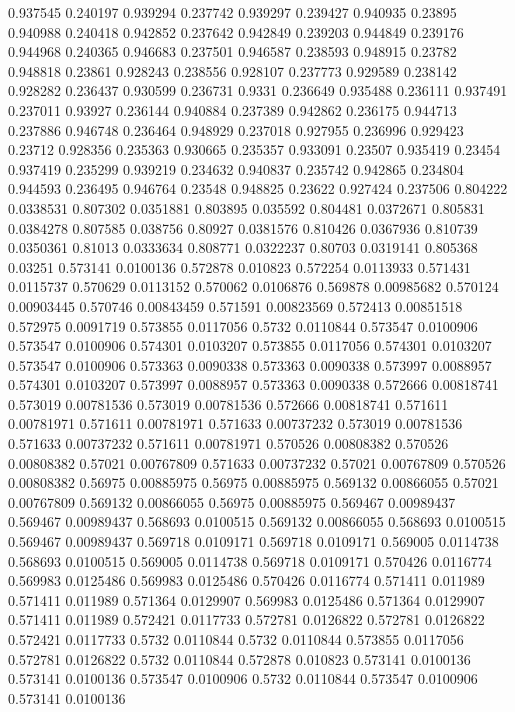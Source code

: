 0.937545 0.240197
0.939294 0.237742
0.939297 0.239427
0.940935 0.23895
0.940988 0.240418
0.942852 0.237642
0.942849 0.239203
0.944849 0.239176
0.944968 0.240365
0.946683 0.237501
0.946587 0.238593
0.948915 0.23782
0.948818 0.23861
0.928243 0.238556
0.928107 0.237773
0.929589 0.238142
0.928282 0.236437
0.930599 0.236731
0.9331 0.236649
0.935488 0.236111
0.937491 0.237011
0.93927 0.236144
0.940884 0.237389
0.942862 0.236175
0.944713 0.237886
0.946748 0.236464
0.948929 0.237018
0.927955 0.236996
0.929423 0.23712
0.928356 0.235363
0.930665 0.235357
0.933091 0.23507
0.935419 0.23454
0.937419 0.235299
0.939219 0.234632
0.940837 0.235742
0.942865 0.234804
0.944593 0.236495
0.946764 0.23548
0.948825 0.23622
0.927424 0.237506
0.804222 0.0338531
0.807302 0.0351881
0.803895 0.035592
0.804481 0.0372671
0.805831 0.0384278
0.807585 0.038756
0.80927 0.0381576
0.810426 0.0367936
0.810739 0.0350361
0.81013 0.0333634
0.808771 0.0322237
0.80703 0.0319141
0.805368 0.03251
0.573141 0.0100136
0.572878 0.010823
0.572254 0.0113933
0.571431 0.0115737
0.570629 0.0113152
0.570062 0.0106876
0.569878 0.00985682
0.570124 0.00903445
0.570746 0.00843459
0.571591 0.00823569
0.572413 0.00851518
0.572975 0.0091719
0.573855 0.0117056
0.5732 0.0110844
0.573547 0.0100906
0.573547 0.0100906
0.574301 0.0103207
0.573855 0.0117056
0.574301 0.0103207
0.573547 0.0100906
0.573363 0.0090338
0.573363 0.0090338
0.573997 0.0088957
0.574301 0.0103207
0.573997 0.0088957
0.573363 0.0090338
0.572666 0.00818741
0.573019 0.00781536
0.573019 0.00781536
0.572666 0.00818741
0.571611 0.00781971
0.571611 0.00781971
0.571633 0.00737232
0.573019 0.00781536
0.571633 0.00737232
0.571611 0.00781971
0.570526 0.00808382
0.570526 0.00808382
0.57021 0.00767809
0.571633 0.00737232
0.57021 0.00767809
0.570526 0.00808382
0.56975 0.00885975
0.56975 0.00885975
0.569132 0.00866055
0.57021 0.00767809
0.569132 0.00866055
0.56975 0.00885975
0.569467 0.00989437
0.569467 0.00989437
0.568693 0.0100515
0.569132 0.00866055
0.568693 0.0100515
0.569467 0.00989437
0.569718 0.0109171
0.569718 0.0109171
0.569005 0.0114738
0.568693 0.0100515
0.569005 0.0114738
0.569718 0.0109171
0.570426 0.0116774
0.569983 0.0125486
0.569983 0.0125486
0.570426 0.0116774
0.571411 0.011989
0.571411 0.011989
0.571364 0.0129907
0.569983 0.0125486
0.571364 0.0129907
0.571411 0.011989
0.572421 0.0117733
0.572781 0.0126822
0.572781 0.0126822
0.572421 0.0117733
0.5732 0.0110844
0.5732 0.0110844
0.573855 0.0117056
0.572781 0.0126822
0.5732 0.0110844
0.572878 0.010823
0.573141 0.0100136
0.573141 0.0100136
0.573547 0.0100906
0.5732 0.0110844
0.573547 0.0100906
0.573141 0.0100136
